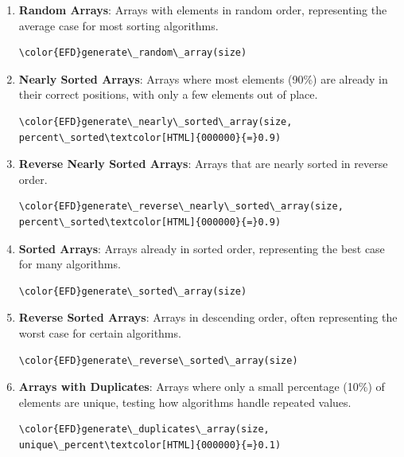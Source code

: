 \documentclass[a4paper,12pt]{article}
\begin{document}
\begin{enumerate}
\item \textbf{Random Arrays}: Arrays with elements in random order, representing the average case for most sorting algorithms.
\begin{Code}
\begin{Verbatim}
\color{EFD}generate\_random\_array(size)
\end{Verbatim}
\end{Code}

\item \textbf{Nearly Sorted Arrays}: Arrays where most elements (90\%) are already in their correct positions, with only a few elements out of place.
\begin{Code}
\begin{Verbatim}
\color{EFD}generate\_nearly\_sorted\_array(size, percent\_sorted\textcolor[HTML]{000000}{=}0.9)
\end{Verbatim}
\end{Code}

\item \textbf{Reverse Nearly Sorted Arrays}: Arrays that are nearly sorted in reverse order.
\begin{Code}
\begin{Verbatim}
\color{EFD}generate\_reverse\_nearly\_sorted\_array(size, percent\_sorted\textcolor[HTML]{000000}{=}0.9)
\end{Verbatim}
\end{Code}

\item \textbf{Sorted Arrays}: Arrays already in sorted order, representing the best case for many algorithms.
\begin{Code}
\begin{Verbatim}
\color{EFD}generate\_sorted\_array(size)
\end{Verbatim}
\end{Code}

\item \textbf{Reverse Sorted Arrays}: Arrays in descending order, often representing the worst case for certain algorithms.
\begin{Code}
\begin{Verbatim}
\color{EFD}generate\_reverse\_sorted\_array(size)
\end{Verbatim}
\end{Code}

\item \textbf{\textbf{Arrays with Duplicates}}: Arrays where only a small percentage (10\%) of elements are unique, testing how algorithms handle repeated values.
\begin{Code}
\begin{Verbatim}
\color{EFD}generate\_duplicates\_array(size, unique\_percent\textcolor[HTML]{000000}{=}0.1)
\end{Verbatim}
\end{Code}
\end{enumerate}
\end{document}

